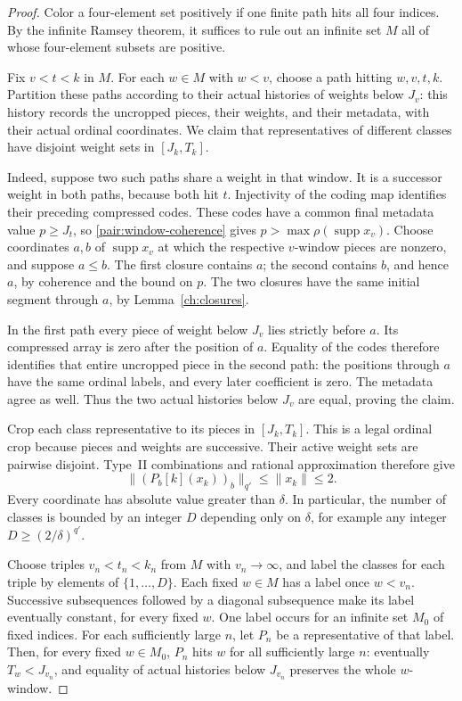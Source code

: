 \begin{proof}
Color a four-element set positively if one finite path hits all four
indices.  By the infinite Ramsey theorem, it suffices to rule out an
infinite set $M$ all of whose four-element subsets are positive.

Fix $v<t<k$ in $M$.  For each $w\in M$ with $w<v$, choose a path hitting
$w,v,t,k$.  Partition these paths according to their actual histories of
weights below $J_v$: this history records the uncropped pieces, their
weights, and their metadata, with their actual ordinal coordinates.
We claim that representatives of different classes have disjoint weight
sets in $[J_k,T_k]$.

Indeed, suppose two such paths share a weight in that window.  It is a
successor weight in both paths, because both hit $t$.  Injectivity of the
coding map identifies their preceding compressed codes.  These codes have
a common final metadata value $p\ge J_t$, so
\eqref{pair:window-coherence} gives
$p>\max\rho(\operatorname{supp}x_v)$.  Choose coordinates $a,b$ of
$\operatorname{supp}x_v$ at which the respective $v$-window pieces are
nonzero, and suppose $a\le b$.  The first closure contains $a$; the second
contains $b$, and hence $a$, by coherence and the bound on $p$.  The two
closures have the same initial segment through $a$, by
Lemma~\ref{ch:closures}.

In the first path every piece of weight below $J_v$ lies strictly before
$a$.  Its compressed array is zero after the position of $a$.  Equality
of the codes therefore identifies that entire uncropped piece in the
second path: the positions through $a$ have the same ordinal labels, and
every later coefficient is zero.  The metadata agree as well.  Thus the
two actual histories below $J_v$ are equal, proving the claim.

Crop each class representative to its pieces in $[J_k,T_k]$.  This is a
legal ordinal crop because pieces and weights are successive.  Their
active weight sets are pairwise disjoint.  Type~II combinations and
rational approximation therefore give
\[
 \big\|(P_b[k](x_k))_b\big\|_{q'}\le\|x_k\|\le2.
\]
Every coordinate has absolute value greater than $\delta$.  In particular,
the number of classes is bounded by an integer $D$ depending only on
$\delta$, for example any integer $D\ge(2/\delta)^{q'}$.

Choose triples $v_n<t_n<k_n$ from $M$ with $v_n\to\infty$, and label the
classes for each triple by elements of $\{1,\ldots,D\}$.  Each fixed
$w\in M$ has a label once $w<v_n$.  Successive subsequences followed by a
diagonal subsequence make its label eventually constant, for every fixed
$w$.  One label occurs for an infinite set $M_0$ of fixed indices.  For
each sufficiently large $n$, let $P_n$ be a representative of that label.
Then, for every fixed $w\in M_0$, $P_n$ hits $w$ for all sufficiently
large $n$: eventually $T_w<J_{v_n}$, and equality of actual histories
below $J_{v_n}$ preserves the whole $w$-window.


\end{proof}
